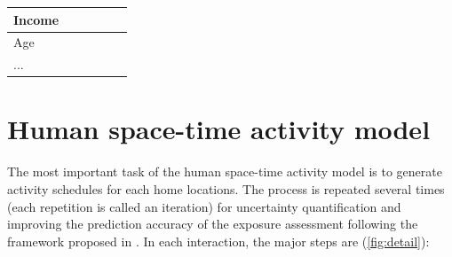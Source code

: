 \documentclass[]{article}
\begin{document}
\begin{table}[!h]
{\begin{tabular}{l|l|l|l|l|l}
Income         &                        &                                                                                                      &                                                                                   &                                                                  &                                                                                                                                                                   \\ \hline
Age            &                        &                                                                                                      &                                                                                   &                                                                  &                                                                                                                                                                   \\ \hline
...            &                        &                                                                                                      &                                                                                   &                                                                  &                                                                                                                                                                   \\ \hline
\end{tabular}%
}
\end{table}

\section{Human space-time activity model}
\label{sec:model}

The most important task of the human space-time activity model is to generate activity schedules for each home locations. The process is repeated several times (each repetition is called an iteration) for uncertainty quantification and improving the prediction accuracy of the exposure assessment following the framework proposed in \cite{lu2019activity}. In each interaction, the major steps are (\cref{fig:detail}):   
\end{document}
